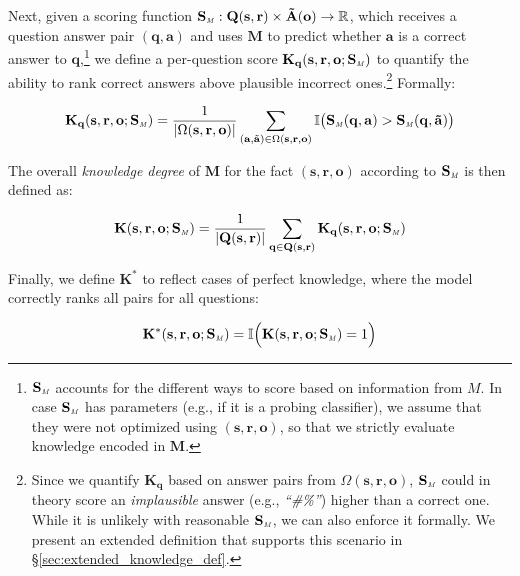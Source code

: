 \begin{definition}
Next, given a scoring function \( \mathbf{S_{\text{\tiny \emph{M}}}} : \mathbf{Q(s,r)} \times \mathbf{\tilde{A}(o)} \to \mathbb{R} \),
which receives a question answer pair $\mathbf{(q,a)}$ and uses $\mathbf{M}$ to predict whether $\mathbf{a}$ is a correct answer to $\mathbf{q}$,\footnote{
$\mathbf{S_{\text{\tiny \emph{M}}}}$ 
accounts for the different ways to score 
based on information from $M$. In case $\mathbf{S_{\text{\tiny \emph{M}}}}$ has parameters (e.g., if it is a probing classifier), we assume that they were not optimized using $\mathbf{(s,r,o)}$, 
so that we strictly evaluate knowledge encoded in $\mathbf{M}$.}
we define a per-question score $\mathbf{K}_{\mathbf{q}}(\mathbf{s,r,o}; \mathbf{S_{\text{\tiny \emph{M}}}})$ to quantify the ability to rank correct answers above plausible incorrect ones.\footnote{Since we quantify $\mathbf{K_q}$ based on answer pairs from $\Omega(\mathbf{s,r,o})$, $\mathbf{S_{\text{\tiny \emph{M}}}}$ could in theory score an \textit{implausible} answer (e.g., \textit{``\#\%''}) higher than a correct one. While it is unlikely with reasonable $\mathbf{S_{\text{\tiny \emph{M}}}}$, we can also enforce it formally. We present an extended definition that supports this scenario in \S\ref{sec:extended_knowledge_def}.} Formally:

\vspace{-8pt}
\begin{equation}
\label{eq:K_q}
\mathbf{K}_{\mathbf{q}}(\mathbf{s,r,o}; \mathbf{S_{\text{\tiny \emph{M}}}}) = 
\frac{1}{|\Omega(\mathbf{s,r,o})|}
\sum_{(\mathbf{a}, \tilde{\mathbf{a}}) \in \Omega(\mathbf{s,r,o})}
\mathbb{I} \bigl(
    \mathbf{S_{\text{\tiny \emph{M}}}}(\mathbf{q,a}) > \mathbf{S_{\text{\tiny \emph{M}}}}(\mathbf{q,\tilde{a}})
\bigr)
\end{equation}


The overall \emph{knowledge degree} of 
$\mathbf{M}$ for the fact $\mathbf{(s,r,o)}$ according to $\mathbf{S_{\text{\tiny \emph{M}}}}$ is then defined as:

\vspace{-8pt}
\begin{equation}
\label{eq:K}
\mathbf{K}(\mathbf{s,r,o}; \mathbf{S_{\text{\tiny \emph{M}}}}) =
\frac{1}{|\mathbf{Q(s,r)}|}
\sum_{\mathbf{q} \in \mathbf{Q(s,r)}}
\mathbf{K}_{\mathbf{q}}(\mathbf{s,r,o}; \mathbf{S_{\text{\tiny \emph{M}}}})
\end{equation}

Finally, we define \( \mathbf{K}^\ast \) to reflect cases of perfect knowledge, where the model correctly ranks all pairs for all questions:

\vspace{-10pt}
\begin{equation}
\label{eq:k_star}
\mathbf{K}^\ast(\mathbf{s,r,o}; \mathbf{S_{\text{\tiny \emph{M}}}}) = \mathbb{I}\Bigl(\mathbf{K}(\mathbf{s,r,o}; \mathbf{S_{\text{\tiny \emph{M}}}}) = 1\Bigr)
\end{equation}

\end{definition}




